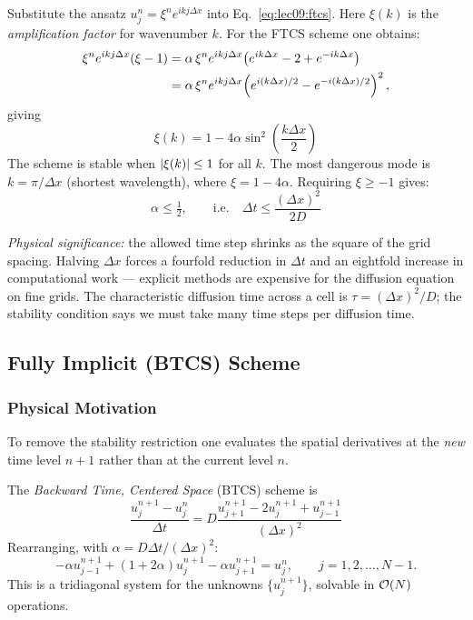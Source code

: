 Substitute the ansatz $u_j^n = \xi^n e^{ikj\Delta x}$ into
Eq.~\eqref{eq:lec09:ftcs}.  Here $\xi(k)$ is the \emph{amplification
factor} for wavenumber $k$. For the FTCS scheme one obtains:
\begin{align}
  \xi^n e^{ikj\Delta x}(\xi-1)
  &= \alpha\,\xi^n e^{ikj\Delta x}
     \!\left(e^{ik\Delta x}-2+e^{-ik\Delta x}\right) \notag\\
  &= \alpha\,\xi^n e^{ikj\Delta x}
     \!\left(e^{i(k\Delta x)/2}-e^{-i(k\Delta x)/2}\right)^2,
  \label{eq:lec09:vn-algebra}
\end{align}
giving
\begin{equation}
  \boxed{\xi(k) = 1 - 4\alpha\sin^2\!\!\left(\frac{k\Delta x}{2}\right)}
  \label{eq:lec09:ftcs-amplification}
\end{equation}
The scheme is stable when $\left|\xi(k)\right|\leq 1$ for all $k$.  The most
dangerous mode is $k=\pi/\Delta x$ (shortest wavelength), where
$\xi = 1-4\alpha$.  Requiring $\xi\geq -1$ gives:
\begin{equation}
  \boxed{\alpha \leq \tfrac{1}{2},
  \qquad\text{i.e.}\quad
  \Delta t \leq \frac{(\Delta x)^2}{2D}}
  \label{eq:lec09:ftcs-stability}
\end{equation}

\textit{Physical significance:} the allowed time step shrinks as the
square of the grid spacing.  Halving $\Delta x$ forces a fourfold
reduction in $\Delta t$ and an eightfold increase in computational
work — explicit methods are expensive for the diffusion equation on
fine grids.  The characteristic diffusion time across a cell is
$\tau = (\Delta x)^2/D$; the stability condition says we must take
many time steps per diffusion time.

\subsection{Fully Implicit (BTCS) Scheme}\label{subsec:lec09:btcs}

\subsubsection*{Physical Motivation}
To remove the stability restriction one evaluates the spatial
derivatives at the \emph{new} time level $n+1$ rather than at the
current level $n$.

The \emph{Backward Time, Centered Space} (BTCS) scheme is
\begin{equation}
  \boxed{
  \frac{u_j^{n+1}-u_j^{n}}{\Delta t}
  = D\frac{u_{j+1}^{n+1}-2u_j^{n+1}+u_{j-1}^{n+1}}{(\Delta x)^2}}
  \label{eq:lec09:btcs}
\end{equation}
Rearranging, with $\alpha=D\Delta t/(\Delta x)^2$:
\begin{equation}
  -\alpha u_{j-1}^{n+1}+(1+2\alpha)u_j^{n+1}-\alpha u_{j+1}^{n+1}
  = u_j^{n},
  \qquad j=1,2,\ldots,N-1.
  \label{eq:lec09:btcs-system}
\end{equation}
This is a tridiagonal system for the unknowns $\{u_j^{n+1}\}$, solvable
in $\mathcal{O}\!\left(N\right)$ operations.

